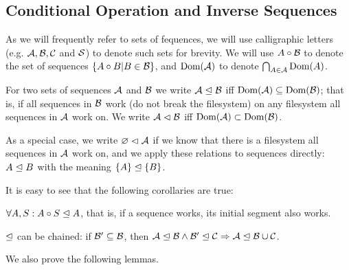 

\subsection{Conditional Operation and Inverse Sequences}

\begin{mydef}
As we will frequently refer to sets of fequences,
we will use calligraphic letters (e.g. $\mathcal{A, B, C}$ and $\mathcal{S}$)
to denote such sets for brevity.
We will use $A\circ\mathcal{B}$ to denote the set of sequences $\{A\circ B|B\in\mathcal{B}\}$,
and $\textrm{Dom}({\mathcal{A}})$ to denote $\bigcap_{A\in\mathcal{A}} \textrm{Dom}({A})$.
\end{mydef}

\begin{mydef}[$\worksmsign$, $\worksmeqsign$]
For two sets of sequences $\mathcal{A}$ and $\mathcal{B}$
we write ${\mathcal{A}}\trianglelefteq{\mathcal{B}}$ iff $\textrm{Dom}({\mathcal{A}}) \subseteq \textrm{Dom}({\mathcal{B}})$;
that is, if all sequences in $\mathcal{B}$ work (do not break the filesystem)
on any filesystem all sequences in $\mathcal{A}$ work on.
We write ${\mathcal{A}}\vartriangleleft{\mathcal{B}}$ iff $\textrm{Dom}({\mathcal{A}}) \subset \textrm{Dom}({\mathcal{B}})$.

As a special case, we write ${\varnothing}\vartriangleleft{\mathcal{A}}$ if we know that there is a filesystem
all sequences in $\mathcal{A}$ work on,
and we apply these relations to sequences directly:
${A}\trianglelefteq{B}$ with the meaning ${\{A\}}\trianglelefteq{\{B\}}$.
\end{mydef}

It is easy to see that the following corollaries are true:

\begin{mycor}\label{worksextpostfix}
$\forall A,S: {A\circ S}\trianglelefteq{A}$, that is, if a sequence works, its initial segment also works.
\end{mycor}

\begin{mycor}\label{workschained}
$\worksmeqsign$ can be chained:
if $\mathcal{B'}\subseteq\mathcal{B}$, then
${\mathcal{A}}\trianglelefteq{\mathcal{B}} \wedge {\mathcal{B'}}\trianglelefteq{\mathcal{C}} \Rightarrow {\mathcal{A}}\trianglelefteq{\mathcal{B}\cup\mathcal{C}}$.
\end{mycor}

We also prove the following lemmas.

